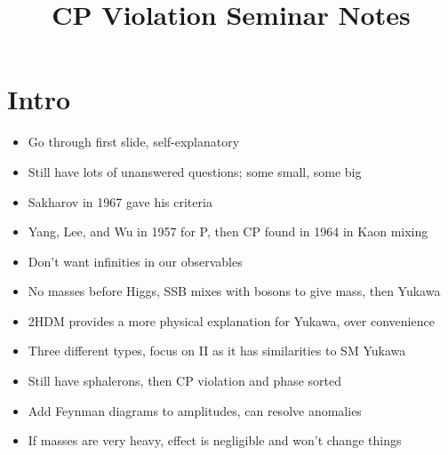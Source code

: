 \documentclass[12pt,a4paper]{article}
\title{\vspace{-3em}CP Violation Seminar Notes}
\author{}
\date{}
\begin{document}
\maketitle
\vspace{-4em}
\section{Intro}
\begin{itemize}
    \item Go through first slide, self-explanatory
    \item Still have lots of unanswered questions; some small, some big
    \item Sakharov in 1967 gave his criteria
    \item Yang, Lee, and Wu in 1957 for P, then CP found in 1964 in Kaon mixing
    \item Don't want infinities in our observables
    \item No masses before Higgs, SSB mixes with bosons to give mass, then Yukawa
    \item 2HDM provides a more physical explanation for Yukawa, over convenience
    \item Three different types, focus on II as it has similarities to SM Yukawa
    \item Still have sphalerons, then CP violation and phase sorted
    \item Add Feynman diagrams to amplitudes, can resolve anomalies
    \item If masses are very heavy, effect is negligible and won't change things
\end{itemize}
\end{document}
